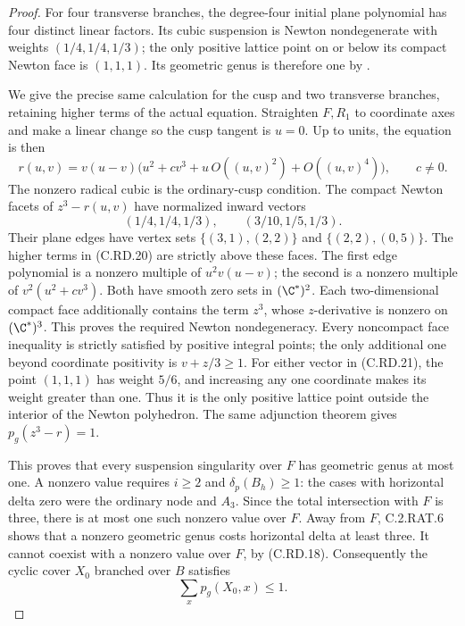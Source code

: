 \begin{proof}
For four transverse branches, the degree-four
initial plane polynomial has four distinct
linear factors. Its cubic suspension is Newton
nondegenerate with weights $(1/4,1/4,1/3)$;
the only positive lattice point on or below
its compact Newton face is $(1,1,1)$. Its
geometric genus is therefore one by
\cite[Theorem 2.1.1 and Corollary 2.1.3]{MerleTeissier1977}.

We give the precise same calculation for the cusp
and two transverse branches, retaining higher
terms of the actual equation. Straighten $F,R_1$
to coordinate axes and make a linear change so
the cusp tangent is $u=0$. Up to units, the
equation is then
\[
 r(u,v)=v(u-v)\bigl(u^2+c v^3+
           u\,O((u,v)^2)+O((u,v)^4)\bigr),
                  \qquad c\ne0.
\tag{C.RD.20}
\]
The nonzero radical cubic is the ordinary-cusp
condition. The compact Newton facets of
$z^3-r(u,v)$ have normalized inward vectors
\[
             (1/4,1/4,1/3),\qquad
             (3/10,1/5,1/3).
\tag{C.RD.21}
\]
Their plane edges have vertex sets
$\{(3,1),(2,2)\}$ and
$\{(2,2),(0,5)\}$. The higher terms in
(C.RD.20) are strictly above these faces.
The first edge polynomial is a nonzero multiple
of $u^2v(u-v)$; the second is a nonzero multiple
of $v^2(u^2+c v^3)$. Both have smooth zero sets
in $(\C^*)^2$. Each two-dimensional compact
face additionally contains the term $z^3$,
whose $z$-derivative is nonzero on $(\C^*)^3$.
This proves the required Newton nondegeneracy.
Every noncompact face inequality is strictly
satisfied by positive integral points; the only
additional one beyond coordinate positivity is
$v+z/3\ge1$.
For either vector in (C.RD.21), the point
$(1,1,1)$ has weight $5/6$, and increasing any
one coordinate makes its weight greater than
one. Thus it is the only positive lattice
point outside the interior of the Newton
polyhedron. The same adjunction theorem gives
$p_g(z^3-r)=1$.

This proves that every suspension singularity
over $F$ has geometric genus at most one.
A nonzero value requires $i\ge2$ and
$\delta_p(B_h)\ge1$: the cases with horizontal
delta zero were the ordinary node and $A_3$.
Since the total intersection with $F$ is three,
there is at most one such nonzero value over
$F$. Away from $F$, C.2.RAT.6 shows that a
nonzero geometric genus costs horizontal delta
at least three. It cannot coexist with a
nonzero value over $F$, by (C.RD.18).
Consequently the cyclic cover $X_0$ branched
over $B$ satisfies
\[
                        \sum_x p_g(X_0,x)\le1.
\tag{C.RD.22}
\]


\end{proof}
